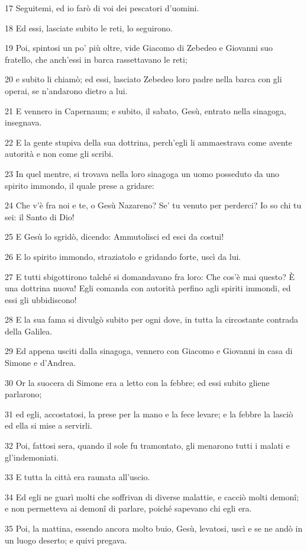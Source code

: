 \par 17 Seguitemi, ed io farò di voi dei pescatori d'uomini.
\par 18 Ed essi, lasciate subito le reti, lo seguirono.
\par 19 Poi, spintosi un po' più oltre, vide Giacomo di Zebedeo e Giovanni suo fratello, che anch'essi in barca rassettavano le reti;
\par 20 e subito li chiamò; ed essi, lasciato Zebedeo loro padre nella barca con gli operai, se n'andarono dietro a lui.
\par 21 E vennero in Capernaum; e subito, il sabato, Gesù, entrato nella sinagoga, insegnava.
\par 22 E la gente stupiva della sua dottrina, perch'egli li ammaestrava come avente autorità e non come gli scribi.
\par 23 In quel mentre, si trovava nella loro sinagoga un uomo posseduto da uno spirito immondo, il quale prese a gridare:
\par 24 Che v'è fra noi e te, o Gesù Nazareno? Se' tu venuto per perderci? Io so chi tu sei: il Santo di Dio!
\par 25 E Gesù lo sgridò, dicendo: Ammutolisci ed esci da costui!
\par 26 E lo spirito immondo, straziatolo e gridando forte, uscì da lui.
\par 27 E tutti sbigottirono talché si domandavano fra loro: Che cos'è mai questo? È una dottrina nuova! Egli comanda con autorità perfino agli spiriti immondi, ed essi gli ubbidiscono!
\par 28 E la sua fama si divulgò subito per ogni dove, in tutta la circostante contrada della Galilea.
\par 29 Ed appena usciti dalla sinagoga, vennero con Giacomo e Giovanni in casa di Simone e d'Andrea.
\par 30 Or la suocera di Simone era a letto con la febbre; ed essi subito gliene parlarono;
\par 31 ed egli, accostatosi, la prese per la mano e la fece levare; e la febbre la lasciò ed ella si mise a servirli.
\par 32 Poi, fattosi sera, quando il sole fu tramontato, gli menarono tutti i malati e gl'indemoniati.
\par 33 E tutta la città era raunata all'uscio.
\par 34 Ed egli ne guarì molti che soffrivan di diverse malattie, e cacciò molti demonî; e non permetteva ai demonî di parlare, poiché sapevano chi egli era.
\par 35 Poi, la mattina, essendo ancora molto buio, Gesù, levatosi, uscì e se ne andò in un luogo deserto; e quivi pregava.
